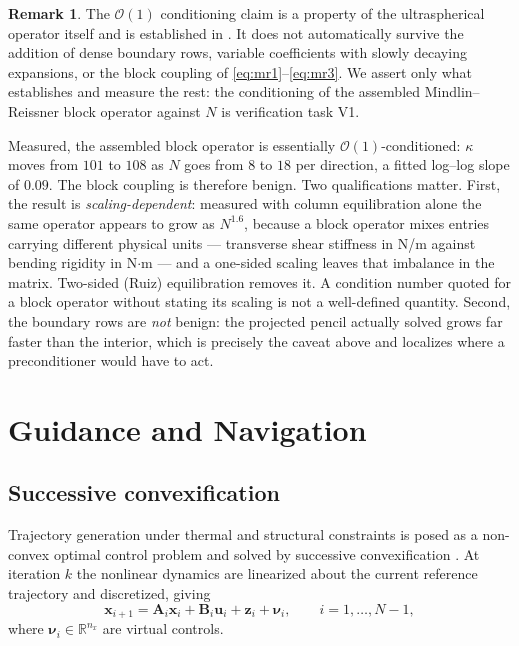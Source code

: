 \documentclass[11pt,a4paper]{article}
\theoremstyle{definition}
\newtheorem{remark}[theorem]{Remark}
\numberwithin{equation}{section}
\newcommand{\R}{\mathbb{R}}
\begin{document}
\begin{remark}
The $\mathcal{O}(1)$ conditioning claim is a property of the ultraspherical operator itself and is established in \cite{olver2013}. It does not automatically survive the addition of dense boundary rows, variable coefficients with slowly decaying expansions, or the block coupling of \cref{eq:mr1}--\cref{eq:mr3}. We assert only what \cite{olver2013} establishes and measure the rest: the conditioning of the assembled Mindlin--Reissner block operator against $N$ is verification task V1.

Measured, the assembled block operator is essentially $\mathcal{O}(1)$-conditioned: $\kappa$ moves from $101$ to $108$ as $N$ goes from $8$ to $18$ per direction, a fitted log--log slope of $0.09$. The block coupling is therefore benign. Two qualifications matter. First, the result is \emph{scaling-dependent}: measured with column equilibration alone the same operator appears to grow as $N^{1.6}$, because a block operator mixes entries carrying different physical units --- transverse shear stiffness in N/m against bending rigidity in N$\cdot$m --- and a one-sided scaling leaves that imbalance in the matrix. Two-sided (Ruiz) equilibration removes it. A condition number quoted for a block operator without stating its scaling is not a well-defined quantity. Second, the boundary rows are \emph{not} benign: the projected pencil actually solved grows far faster than the interior, which is precisely the caveat above and localizes where a preconditioner would have to act.
\end{remark}

\section{Guidance and Navigation}
\label{sec:gnc}

\subsection{Successive convexification}
\label{sec:scvx}

Trajectory generation under thermal and structural constraints is posed as a non-convex optimal control problem and solved by successive convexification \cite{mao2016, szmuk2020}. At iteration $k$ the nonlinear dynamics are linearized about the current reference trajectory and discretized, giving
\begin{equation}
\label{eq:scvx_dyn}
\mathbf{x}_{i+1} = \mathbf{A}_i \mathbf{x}_i + \mathbf{B}_i \mathbf{u}_i + \mathbf{z}_i + \bm{\nu}_i,
\qquad i = 1, \dots, N-1,
\end{equation}
where $\bm{\nu}_i \in \R^{n_x}$ are virtual controls.
\end{document}
